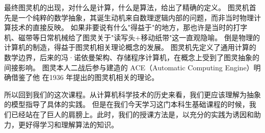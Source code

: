 最终图灵机的出现，对什么是计算，什么是算法，给出了精确的定义。
图灵机首先是一个纯粹的数学抽象，其诞生动机来自数理逻辑内部的问题，而非当时物理计算技术的直接反映。
如果非要说有什么"得益于"的地方，那也许是当时的打字机、磁带等日常机械给了图灵关于"读写头+移动纸带"这一直观隐喻。
倒是物理的计算机的制造，得益于图灵机相关理论概念的发展。
图灵机先定义了通用计算的数学边界，后来的冯·诺依曼架构、存储程序计算机，在概念上受到了图灵抽象的间接影响。
图灵本人二战后参与建造的 ACE（Automatic Computing Engine）明确借鉴了他 在1936 年提出的图灵机相关的理论。

所以回到我们的这次课程。从计算机科学技术的历史来看，我们更应该理解为抽象的模型指导了具体的实践。
但是在我们今天学习这门本科生基础课程的时候，我们已经站在了巨人的肩膀上。此时，我们的授课方法是，以充分的实践为诱因和助力，更好得学习和理解算法的知识。

